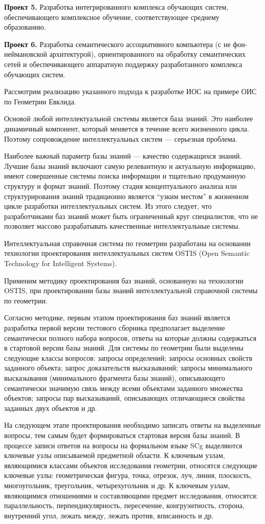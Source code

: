 \textbf{Проект 5.} Разработка интегрированного комплекса обучающих систем, обеспечивающего комплексное обучение, соответствующее среднему образованию.

\textbf{Проект 6.} Разработка семантического ассоциативного компьютера (с не фон-неймановской архитектурой), ориентированного на обработку семантических сетей и обеспечивающего аппаратную поддержку разработанного комплекса обучающих систем.

Рассмотрим реализацию указанного подхода к разработке ИОС на примере ОИС по Геометрии Евклида.

Основой любой интеллектуальной системы является база знаний. Это наиболее динамичный компонент, который меняется в течение всего жизненного цикла. Поэтому сопровождение интеллектуальных систем --- серьезная проблема.

Наиболее важный параметр базы знаний --- качество содержащихся знаний. Лучшие базы знаний включают самую релевантную и актуальную информацию, имеют совершенные системы поиска информации и тщательно продуманную структуру и формат знаний. Поэтому стадия концептуального анализа или структурирования знаний традиционно является ``узким местом'' в жизненном цикле разработки интеллектуальных систем. Из этого следует, что разработчиками баз знаний может быть ограниченный круг специалистов, что не позволяет массово разрабатывать качественные интеллектуальные системы.

Интеллектуальная справочная система по геометрии разработана на основании технологии проектирования интеллектуальных систем OSTIS (Open Semantic Technology for Intelligent Systems).

Применим методику проектирования баз знаний, основанную на технологии OSTIS, при проектировании базы знаний интеллектуальной справочной системы по геометрии.

Согласно методике, первым этапом проектирования баз знаний является разработка первой версии тестового сборника предполагает выделение семантически полного набора вопросов, ответы на которые должны содержаться в стартовой версии базы знаний. Для системы по геометрии были выделены следующие классы вопросов: запросы определений; запросы основных свойств заданного объекта; запрос доказательств высказываний; запросы минимального высказывания (минимального фрагмента базы знаний), описывающего семантически значимую связь между всеми объектами заданного множества объектов; запросы пар высказываний, описывающих отличающиеся свойства заданных двух объектов и др.

На следующем этапе проектирования необходимо записать ответы на выделенные вопросы, тем самым будет формироваться стартовая версия базы знаний. В процессе записи ответов на вопросы на формальном языке SCg выделяются ключевые узлы описываемой предметной области. К ключевым узлам, являющимися классами объектов исследования геометрии, относятся следующие ключевые узлы: геометрическая фигура, точка, отрезок, луч, линия, плоскость, многоугольник, треугольник, четырехугольник и др. К ключевым узлам, являющимися отношениями и составляющими предмет исследования, относятся: параллельность, перпендикулярность, пересечение, конгруэнтность, сторона, внутренний угол, лежать между, лежать против, вписанность и др.

